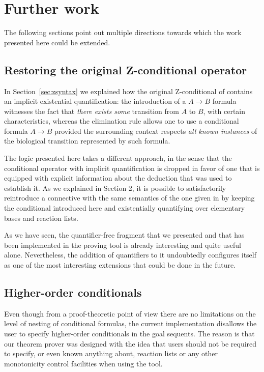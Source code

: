 \section{Further work}

The following sections point out multiple directions towards which the work
presented here could be extended.

\subsection{Restoring the original Z-conditional operator}

In Section~\ref{sec:zsyntax} we explained how the original Z-conditional of
\cite{adding-logic} contains an implicit existential quantification: the
introduction of a $A \rightarrow B$ formula witnesses the fact that \emph{there
  exists some} transition from $A$ to $B$, with certain characteristics, whereas
the elimination rule allows one to use a conditional formula $A \rightarrow B$
provided the surrounding context respects \emph{all known instances} of the
biological transition represented by such formula.

The logic presented here takes a different approach, in the sense that the
conditional operator with implicit quantification is dropped in favor of one
that is equipped with explicit information about the deduction that was used to
establish it. As we explained in Section 2, it is possible to satisfactorily
reintroduce a connective with the same semantics of the one given in
\cite{adding-logic} by keeping the conditional introduced here and existentially
quantifying over elementary bases and reaction lists.

As we have seen, the quantifier-free fragment that we presented and that has
been implemented in the proving tool is already interesting and quite useful
alone. Nevertheless, the addition of quantifiers to it undoubtedly configures
itself as one of the most interesting extensions that could be done in the
future.

\subsection{Higher-order conditionals}

Even though from a proof-theoretic point of view there are no limitations on the
level of nesting of conditional formulas, the current implementation disallows
the user to specify higher-order conditionals in the goal sequents.  The reason
is that our theorem prover was designed with the idea that users should not be
required to specify, or even known anything about, reaction lists or any other
monotonicity control facilities when using the tool.

